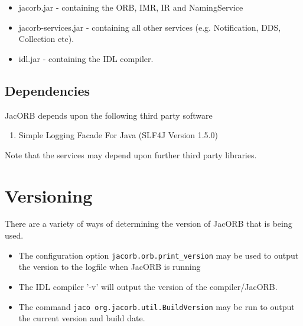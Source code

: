 \begin{itemize}
\item jacorb.jar          - containing the ORB, IMR, IR and NamingService
\item jacorb-services.jar - containing all other services (e.g. Notification, DDS, Collection etc).
\item idl.jar             - containing the IDL compiler.
\end{itemize}

\subsection{Dependencies}

JacORB depends upon the following third party software
\begin{enumerate}
\item Simple Logging Facade For Java (SLF4J Version 1.5.0)
\end{enumerate}

Note that the services may depend upon further third party libraries.

\section{Versioning}
There are a variety of ways of determining the version of JacORB that is being used.
\begin{itemize}
\item The configuration option {\tt jacorb.orb.print\_version} may be used to output the version to the logfile when JacORB is running
\item The IDL compiler '-v' will output the version of the compiler/JacORB.
\item The command {\tt jaco org.jacorb.util.BuildVersion} may be run to output the current version and build date.
\end{itemize}

